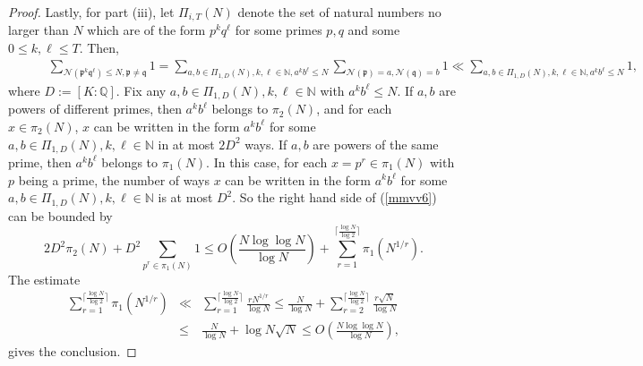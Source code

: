 \documentclass[11pt]{amsart}
\theoremstyle{definition}
\newcommand{\N}{{\mathbb N}}
\newcommand{\NN}{{\mathcal N}}
\newcommand{\Q}{{\mathbb Q}}
\newcommand{\mf}{\mathfrak}
\begin{document}
\begin{proof}
Lastly, for part (iii), let $\Pi_{i,T}(N)$ denote the set of natural numbers no larger than $N$ which are of the form $p^{k}q^{\ell}$ for some primes $p,q$ and some $0\leq k, \ell \leq T$. Then,
\begin{equation}\label{mmvv6}
    \begin{split}
      &\qquad \sum_{\NN(\mf p^{k}\mf q^{\ell})\leq N, \mf p\neq \mf q} 1=\sum_{a,b\in \Pi_{1,D}(N),k,\ell\in\N,a^{k}b^{\ell}\leq N}\sum_{\NN(\mf p)=a, \NN(\mf q)=b}1
       \ll \sum_{a,b\in \Pi_{1,D}(N),k,\ell\in\N,a^{k}b^{\ell}\leq N} 1,
    \end{split}
\end{equation}
where $D:=[K:\Q]$.
Fix any $a,b\in \Pi_{1, D}(N),k,\ell\in\N$ with $a^{k}b^{\ell}\leq N$. If $a,b$ are powers of different primes, then $a^{k}b^{\ell}$ belongs to $\pi_{2}(N)$, and for each $x\in \pi_{2}(N)$, $x$ can be written in the form $a^{k}b^{\ell}$ for some  $a,b\in \Pi_{1,D}(N),k,\ell\in\N$ in at most $2D^{2}$ ways. If $a,b$ are powers of the same prime, then $a^{k}b^{\ell}$ belongs to $\pi_{1}(N)$. In this case, for each $x=p^{r}\in \pi_{1}(N)$ with $p$ being a prime, the number of ways $x$ can be written in the form $a^{k}b^{\ell}$ for some $a,b\in \Pi_{1,D}(N),k,\ell\in\N$ is  at most $D^{2}$. So  the right hand side of (\ref{mmvv6}) can be bounded by
 $$2D^{2}\pi_{2}(N)+D^{2}\sum_{p^{r}\in \pi_{1}(N)} 1
       \leq O\left(\frac{N\log\log N}{\log N}\right)+\sum_{r=1}^{\lceil\frac{\log N}{\log 2}\rceil}\pi_{1}({N}^{1/r}).$$
The estimate
\begin{eqnarray*}
    \sum_{r=1}^{\lceil\frac{\log N}{\log 2}\rceil}\pi_{1}({N}^{1/r})
      & \ll & \sum_{r=1}^{\lceil\frac{\log N}{\log 2}\rceil}\frac{r{N}^{1/r}}{\log N}
      \leq \frac{N}{\log N}+\sum_{r=2}^{\lceil\frac{\log N}{\log 2}\rceil}\frac{r\sqrt{N}}{\log N}
      \\& \leq & \frac{N}{\log N}+\log N\sqrt{N}
      \leq O\left(\frac{N\log\log N}{\log N}\right),
\end{eqnarray*} 
gives the conclusion.
\end{proof}
\end{document}
